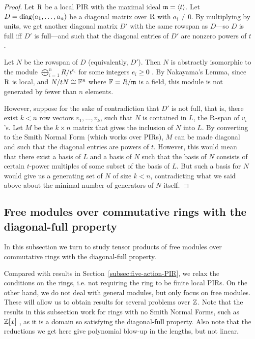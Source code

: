 \begin{proof}
Let $\mathrm{R}$ be a local PIR with the maximal ideal $\mathfrak{m} = \langle t \rangle$. Let $D=\operatorname{diag}(a_1, \dots, a_n)$ be a diagonal matrix over $\mathrm{R}$ with $a_i\neq 0$. By multiplying by units, we get another diagonal matrix $D'$ with the same rowspan as $D$---so $D$ is full iff $D'$ is full---and such that the diagonal entries of $D'$ are nonzero powers of $t$. 

Let $N$ be the rowspan of $D$ (equivalently, $D'$). Then $N$ is abstractly isomorphic to the module $\bigoplus_{i=1}^n R / t^{e_i}$ for some integers $e_i\geq 0$ . By Nakayama's Lemma, since $\mathrm{R}$ is local, and $N / t N \cong \mathbb{F}^n$ where $\mathbb{F} = R/\mathfrak{m}$ is a field, this module is not generated by fewer than $n$ elements. 

However, suppose for the sake of contradiction that $D'$ is not full, that is, there exist $k<n$ row vectors $v_1, \dots, v_k$, such that $N$ is contained in $L$, the $\mathrm{R}$-span of $v_i$'s. Let $M$ be the $k \times n$ matrix that gives the inclusion of $N$ into $L$. By converting to the Smith Normal Form (which works over PIRs), $M$ can be made diagonal and such that the diagonal entries are powers of $t$. However, this would mean that there exist a basis of $L$ and a basis of $N$ such that the basis of $N$ consists of certain $t$-power multiples of some subset of the basis of $L$. But such a basis for $N$ would give us a generating set of $N$ of size $k < n$, contradicting what we said above about the minimal number of generators of $N$ itself.
\end{proof}


\subsection{Free modules over commutative rings with the diagonal-full property}

In this subsection we turn to study tensor products of free modules over commutative rings with the diagonal-full property. 

Compared with results in Section~\ref{subsec:five-action-PIR}, we relax the conditions on the rings, i.e. not requiring the ring to be finite local PIRs. On the other hand, we do not deal with general modules, but only focus on free modules. These will allow us to obtain results for several problems over $\mathbb{Z}$. Note that the results in this subsection work for rings with no Smith Normal Forms, such as $\mathbb{Z}[x]$ \cite[Example 2.2]{Sta16}, as it is a domain so satisfying the diagonal-full property.
Also note that the reductions we get here give polynomial blow-up in the lengths, but not linear.

